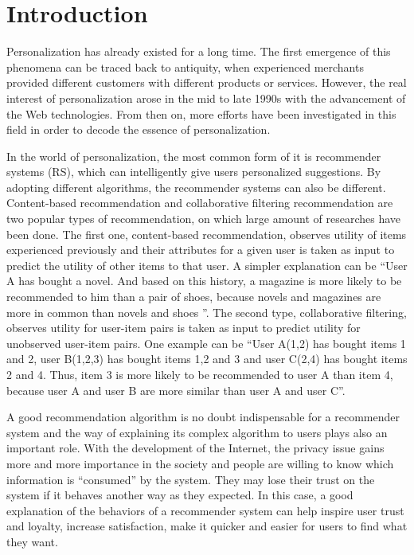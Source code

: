 \section{Introduction}

  \indent Personalization has already existed for a long time. The first emergence of this phenomena 
  can be traced back to antiquity,
  when experienced merchants provided different customers with different products or services\cite{adomavicius2008personalization}. However, 
  the real interest of personalization arose in the mid to late 1990s with the advancement of the Web technologies\cite{don2011managing}.
  From then on, more efforts have been investigated in this field in order to decode the essence of personalization.
  
  \indent In the world of personalization, the most common form of it is recommender systems (RS), which can intelligently
  give users personalized suggestions. By adopting different algorithms, the recommender systems can also be different.
  Content-based recommendation and collaborative filtering recommendation are two popular types of recommendation, on which large amount 
  of researches have been done. The first one, content-based recommendation, observes utility of items experienced previously and
  their attributes for a given user is taken as input to predict the utility of other items to that user\cite{balabanovic1997fab}.
  A simpler explanation can be ``User A has bought a novel. And based on this history, a magazine is more likely to be recommended to him than a pair of shoes,
  because novels and magazines are more in common than novels and shoes ''. The second type, collaborative filtering, observes utility for user-item pairs is taken
  as input to predict utility for unobserved user-item pairs\cite{balabanovic1997fab}. One example can be ``User A(1,2) has bought items 1 and 2, user B(1,2,3) has bought items 1,2 and 3 and user C(2,4) has bought items 2 and 4.
  Thus, item 3 is more likely to be recommended to user A than item 4, because user A and user B are more similar than user A and user C''.
  
  \indent A good recommendation algorithm is no doubt indispensable for a recommender system and the way of explaining its complex algorithm to users
  plays also an important role. With the development of the Internet, the privacy issue gains more and more importance in the society
  and people are willing to know which information is ``consumed'' by the system. They may lose their trust on the system if
  it behaves another way as they expected. In this case, a good explanation of the behaviors of a recommender system 
  can help inspire user trust and loyalty, increase satisfaction, make it quicker and easier for users to find what they want\cite{tintarev2007survey}.


